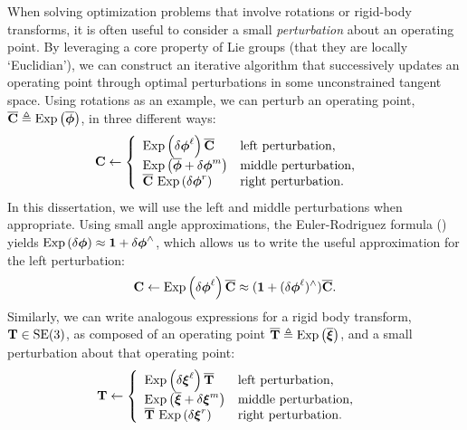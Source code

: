 When solving optimization problems that involve rotations or rigid-body transforms, it is often useful to consider a small \textit{perturbation} about an operating point. By leveraging a core property of Lie groups (that they are locally `Euclidian'), we can construct an iterative algorithm that successively updates an operating point through optimal perturbations in some unconstrained tangent space.
Using rotations as an example, we can perturb an operating point, $\overline{\boldsymbol{\mathbf{C}}} \triangleq \mathrm{Exp}\left({\overline{\boldsymbol{\mathbf{\phi}}}}\right)$, in three different ways:
\begin{align}
\boldsymbol{\mathbf{C}} &\leftarrow \left\{  	\begin{array}{ll}
		\mathrm{Exp}\left({\delta \boldsymbol{\mathbf{\phi}}^\ell}\right) \overline{\boldsymbol{\mathbf{C}}}   & \mbox{left perturbation,} \\
		\mathrm{Exp}\left({\overline{\boldsymbol{\mathbf{\phi}}} + \delta \boldsymbol{\mathbf{\phi}}^m}\right)  & \mbox{middle perturbation,} \\
		\overline{\boldsymbol{\mathbf{C}}} ~ \mathrm{Exp}\left({\delta \boldsymbol{\mathbf{\phi}}^r}\right)  & \mbox{right perturbation.}  \\
	\end{array}
	\right.
\end{align}
In this dissertation, we will use the left and middle perturbations when appropriate. Using small angle approximations, the Euler-Rodriguez formula () yields $\mathrm{Exp}\left({\delta \boldsymbol{\mathbf{\phi}}}\right) \approx \boldsymbol{\mathbf{1}} + \delta \boldsymbol{\mathbf{\phi}}^\wedge$, which allows us to write the useful approximation for the left perturbation:
\begin{equation}
	\boldsymbol{\mathbf{C}} \leftarrow \mathrm{Exp}\left({\delta \boldsymbol{\mathbf{\phi}}^\ell}\right) \overline{\boldsymbol{\mathbf{C}}} \approx (\boldsymbol{\mathbf{1}} + (\delta \boldsymbol{\mathbf{\phi}}^\ell)^\wedge) \overline{\boldsymbol{\mathbf{C}}}.
\end{equation}
Similarly, we can write analogous expressions for a rigid body transform, $\boldsymbol{\mathbf{T}} \in \mathrm{SE}(3)$, as composed of an operating point $\overline{\boldsymbol{\mathbf{T}}} \triangleq \mathrm{Exp}\left({\overline{\boldsymbol{\mathbf{\xi}}}}\right)$, and a small perturbation about that operating point:
\begin{align}
\boldsymbol{\mathbf{T}} &\leftarrow \left\{  	\begin{array}{ll}
		\mathrm{Exp}\left({\delta \boldsymbol{\mathbf{\xi}}^\ell}\right) \overline{\boldsymbol{\mathbf{T}}}   & \mbox{left perturbation,} \\
		\mathrm{Exp}\left({\overline{\boldsymbol{\mathbf{\xi}}} + \delta \boldsymbol{\mathbf{\xi}}^m}\right)  & \mbox{middle perturbation,} \\
		\overline{\boldsymbol{\mathbf{T}}} ~ \mathrm{Exp}\left({\delta \boldsymbol{\mathbf{\xi}}^r}\right)  & \mbox{right perturbation.}  \\
	\end{array}
	\right.
\end{align}
